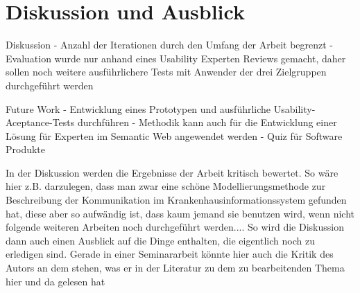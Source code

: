 \chapter{Diskussion und Ausblick}\label{ch:discussion}
Diskussion
- Anzahl der Iterationen durch den Umfang der Arbeit begrenzt
- Evaluation wurde nur anhand eines Usability Experten Reviews gemacht, daher sollen noch weitere ausführlichere Tests mit Anwender der drei Zielgruppen durchgeführt werden

Future Work
- Entwicklung eines Prototypen und ausführliche Usability-Aceptance-Tests durchführen
- Methodik kann auch für die Entwicklung einer Lösung für Experten im Semantic Web angewendet werden
- Quiz für Software Produkte

In der Diskussion werden die Ergebnisse der Arbeit kritisch bewertet.
So wäre hier z.B. darzulegen, dass man zwar eine schöne Modellierungsmethode zur Beschreibung der Kommunikation im Krankenhausinformationssystem gefunden hat, diese aber so aufwändig ist, dass kaum jemand sie benutzen wird, wenn nicht folgende weiteren Arbeiten noch durchgeführt werden....
So wird die Diskussion dann auch einen Ausblick auf die Dinge enthalten, die eigentlich noch zu erledigen sind.
Gerade in einer Seminararbeit könnte hier auch die Kritik des Autors an dem stehen, was er in der Literatur zu dem zu bearbeitenden Thema hier und da gelesen hat
